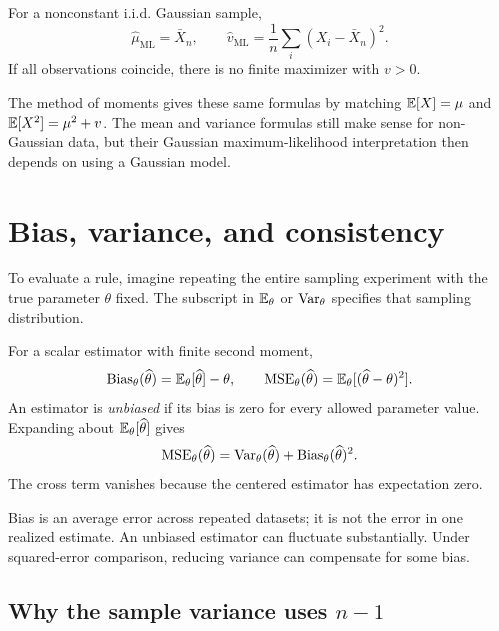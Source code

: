 \begin{result}
For a nonconstant i.i.d. Gaussian sample,
\[
  \widehat\mu_{\mathrm{ML}}=\bar X_n,\qquad
  \widehat v_{\mathrm{ML}}=\frac1n\sum_i(X_i-\bar X_n)^2.
\]
If all observations coincide, there is no finite maximizer with \(v>0\).
\end{result}

The method of moments gives these same formulas by matching
\(\mathbb{E}[X]=\mu\) and \(\mathbb{E}[X^2]=\mu^2+v\). The mean and
variance formulas still make sense for non-Gaussian data, but their Gaussian
maximum-likelihood interpretation then depends on using a Gaussian model.

\section{Bias, variance, and consistency}
\label{sec:estimator-quality}

To evaluate a rule, imagine repeating the entire sampling experiment with
the true parameter \(\theta\) fixed. The subscript in \(\mathbb{E}_\theta\)
or \(\operatorname{Var}_\theta\) specifies that sampling distribution.

\begin{definition}
For a scalar estimator with finite second moment,
\[
  \operatorname{Bias}_\theta(\widehat\theta)=\mathbb{E}_\theta[\widehat\theta]-\theta,
  \qquad
  \operatorname{MSE}_\theta(\widehat\theta)
  =\mathbb{E}_\theta[(\widehat\theta-\theta)^2].
\]
An estimator is \emph{unbiased} if its bias is zero for every allowed
parameter value. Expanding about \(\mathbb{E}_\theta[\widehat\theta]\) gives
\[
  \operatorname{MSE}_\theta(\widehat\theta)
  =\operatorname{Var}_\theta(\widehat\theta)+\operatorname{Bias}_\theta(\widehat\theta)^2.
\]
The cross term vanishes because the centered estimator has expectation zero.
\end{definition}

Bias is an average error across repeated datasets; it is not the error in
one realized estimate. An unbiased estimator can fluctuate substantially.
Under squared-error comparison, reducing variance can compensate for some bias.

\subsection{Why the sample variance uses \(n-1\)}

